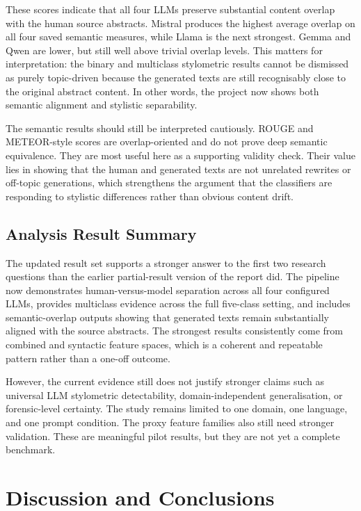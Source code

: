 \documentclass[12pt,a4paper]{article}
\begin{document}
These scores indicate that all four LLMs preserve substantial content overlap with the human source abstracts. Mistral produces the highest average overlap on all four saved semantic measures, while Llama is the next strongest. Gemma and Qwen are lower, but still well above trivial overlap levels. This matters for interpretation: the binary and multiclass stylometric results cannot be dismissed as purely topic-driven because the generated texts are still recognisably close to the original abstract content. In other words, the project now shows both semantic alignment and stylistic separability.

The semantic results should still be interpreted cautiously. ROUGE and METEOR-style scores are overlap-oriented and do not prove deep semantic equivalence. They are most useful here as a supporting validity check. Their value lies in showing that the human and generated texts are not unrelated rewrites or off-topic generations, which strengthens the argument that the classifiers are responding to stylistic differences rather than obvious content drift.

\subsection{Analysis Result Summary}

The updated result set supports a stronger answer to the first two research questions than the earlier partial-result version of the report did. The pipeline now demonstrates human-versus-model separation across all four configured LLMs, provides multiclass evidence across the full five-class setting, and includes semantic-overlap outputs showing that generated texts remain substantially aligned with the source abstracts. The strongest results consistently come from combined and syntactic feature spaces, which is a coherent and repeatable pattern rather than a one-off outcome.

However, the current evidence still does not justify stronger claims such as universal LLM stylometric detectability, domain-independent generalisation, or forensic-level certainty. The study remains limited to one domain, one language, and one prompt condition. The proxy feature families also still need stronger validation. These are meaningful pilot results, but they are not yet a complete benchmark.

\section{Discussion and Conclusions}
\end{document}
